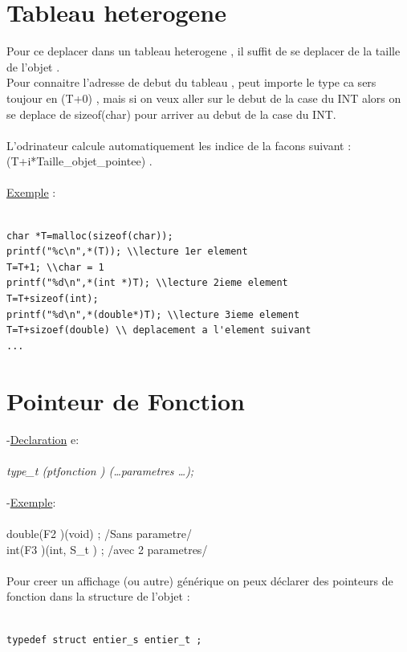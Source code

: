 \documentclass[a4paper,12pt,openany]{book}
\begin{document}
{\section{Tableau heterogene}
Pour ce deplacer dans un tableau heterogene , il suffit de se deplacer de la taille de l'objet .\\
Pour connaitre l'adresse de debut du tableau , peut importe le type ca sers toujour en (T+0) , mais si on veux aller sur le debut de la case du INT alors on se deplace de sizeof(char) pour arriver au debut de la case du INT.\\
\\
L'odrinateur calcule automatiquement les indice de la facons suivant : (T+i*Taille\_objet\_pointee) .\\
\\
\underline{Exemple} : \\
\\
\begin{verbatim}
char *T=malloc(sizeof(char));
printf("%c\n",*(T)); \\lecture 1er element
T=T+1; \\char = 1
printf("%d\n",*(int *)T); \\lecture 2ieme element
T=T+sizeof(int);
printf("%d\n",*(double*)T); \\lecture 3ieme element
T=T+sizoef(double) \\ deplacement a l'element suivant
...
\end{verbatim}




\section{Pointeur de Fonction}

-\underline{Declaration} e: \\
\\
\emph{type\_t  (\∗ptfonction ) (\ldots parametres \ldots);}\\
\\
-\underline{Exemple}:\\
\\
double(\∗F2 )(void)  ;        /\*Sans parametre\*/\\
int(\∗F3 )(int, S\_t \∗)  ;    /\*avec 2 parametres\*/\\
\\
Pour creer un affichage (ou autre) générique on peux déclarer des pointeurs de fonction dans la structure de l'objet :\\
\\
\begin{verbatim}
typedef struct entier_s entier_t ;


\end{verbatim}}
\end{document}
